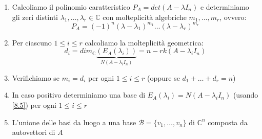 \documentclass[a4paper]{article}
\theoremstyle{break}
\theoremstyle{break}
\theoremstyle{break}
\theoremstyle{break}
\begin{document}
\begin{enumerate}
  \item Calcoliamo il polinomio caratteristico \( P_A = det(A - \lambda I_n) \) e determiniamo
    gli zeri distinti \( \lambda_1, \ldots, \lambda_r \in \mathbb{C} \) con molteplicità
    algebriche \( m_1, \ldots, m_r \), ovvero:
    \[
    P_A = (-1)^n (\lambda - \lambda_1)^{m_1} \ldots (\lambda - \lambda_r)^{m_r}
    \] 

  \item Per ciascuno \( 1 \le i \le r \) calcoliamo la molteplicità geometrica:
    \[
      d_i = dim_{\mathbb{C}}\underbrace{(E_A(\lambda_i))}_{N(A - \lambda_i I_n)} =
      n - rk(A - \lambda_i I_n)
    \] 

  \item Verifichiamo se \( m_i = d_i \) per ogni \( 1 \le i \le r \) (oppure se \( d_1 + \ldots + d_r = n \))

  \item In caso positivo determiniamo una base di \( E_A(\lambda_i) = N(A-\lambda_i I_n) \) 
  (usando \ref{8.5}) per ogni \( 1 \le i \le r \)

  \item L'unione delle basi da luogo a una base \( \mathcal{B} = \{v_1, \ldots, v_n\}  \) di
    \( \mathbb{C}^n \) composta da autovettori di \( A \) 


\end{enumerate}
\end{document}
